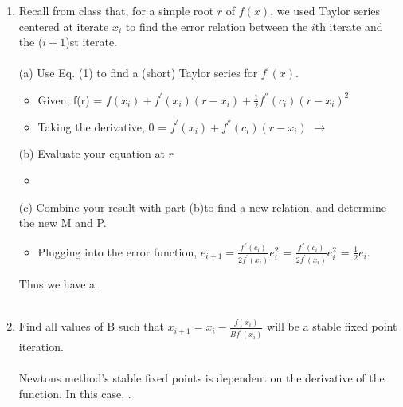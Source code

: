 \documentclass[12pt]{article}
\begin{document}
\begin{enumerate}
	Therefore our . \\ \\
	(b) Determining which method will converge faster \\ \\
	We analyze the derivatives to find which method has a higher multiplicity (which one converges to 0 faster).
	\begin{itemize}
		\item[] $f(p)$ = $p - \cfrac{p^4-2}{7p^3}$ ; $f^{'}(p)$ = $1 - \cfrac{4p^3*7p^4 - 21p^3(p^4-2)}{(7p^3)^2}$ $\approx$ $c$ - $\cfrac{1}{cp^4}$, where c is an arbitrary constant.
		\item[] $g(p)$ = $\sqrt[3]{\cfrac{2}{p_{n-1}}}$ ; $f^{'}(p)$ = $c - \frac{1}{c^2}$
	\end{itemize}
	Since $f(p)$ has a greater denominator value (it approaches 0 faster), we can conclude that .
	\pagebreak
	\item Recall from class that, for a simple root $r$ of $f(x)$, we used Taylor series centered at iterate $x_i$ to find the error relation between the $i$th iterate and the ($i+1$)st iterate.\\ \\
	(a) Use Eq. (1) to find a (short) Taylor series for $f^{'}(x)$.
	\begin{itemize}
		\item[] Given, f(r) = $f(x_i) + f^{'}(x_i)(r-x_i) + \frac{1}{2} f^{''}(c_i) (r-x_i)^2$
		\item[] Taking the derivative, 0 = $f^{'}(x_i) + f^{''}(c_i) (r-x_i)$ $\rightarrow$ 
	\end{itemize}
	(b) Evaluate your equation at $r$
	\begin{itemize}
		\item[] 
	\end{itemize}
	(c) Combine your result with part (b)to find a new relation, and determine the new M and P.
	\begin{itemize}
		\item[] Plugging into the error function, $e_{i+1} = \frac{f^{''}(c_i)}{2f^{'}(x_i)} e_i^2$ = $\frac{f^{''}(c_i)}{2f^{'}(x_i)} e_i^2$ = $\frac{1}{2}e_i$.
	\end{itemize}
	Thus we have a .\\ \\	
	\item Find all values of B such that $x_{i+1} = x_i - \frac{f(x_i)}{Bf^{'}(x_i)}$ will be a stable fixed point iteration. \\ \\
	Newtons method's stable fixed points is dependent on the derivative of the function. In this case, .
\end{enumerate} 
\end{document}
